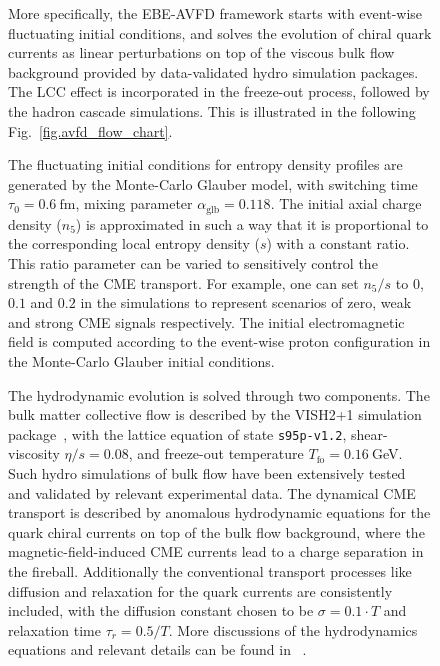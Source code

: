 \begin{figure}[htbp]
More specifically, the EBE-AVFD framework starts with event-wise fluctuating initial conditions, and solves the evolution of chiral quark currents as linear perturbations on top of the viscous bulk flow background provided by data-validated hydro simulation packages. The  LCC effect is incorporated in the freeze-out process, followed by the hadron cascade simulations. 
This is illustrated in the following Fig.~\ref{fig.avfd_flow_chart}.

\begin{figure}[htbp]
\vspace*{-0.01in}
 \label{fig:AVFD_delta}
\end{figure}


The fluctuating initial conditions for entropy density profiles are generated by the Monte-Carlo Glauber model, with switching time $\tau_0=0.6~\text{fm}$, mixing parameter $\alpha_\text{glb} = 0.118$. The initial axial charge density ($n_5$) is approximated in such a way that it is proportional to  the corresponding local entropy density ($s$) with a constant ratio. This ratio parameter can be varied to sensitively control the strength of the CME transport. For example, one can set  $n_5/s$ to $0$, $0.1$ and $0.2$  in the simulations to represent scenarios of zero, weak and strong CME signals respectively. The initial electromagnetic field is computed according to the event-wise proton configuration in the Monte-Carlo Glauber initial conditions.

The hydrodynamic evolution is solved through two components. The bulk matter collective flow is described by the VISH2+1 simulation package~\cite{Shen:2014vra}, with the lattice equation of state \texttt{s95p-v1.2}, shear-viscosity $\eta/s=0.08$, and freeze-out temperature $T_\text{fo}=0.16~$GeV. Such hydro simulations of bulk flow have been extensively tested and validated by relevant experimental data. The dynamical CME transport is described by anomalous hydrodynamic equations for the quark chiral currents on top of the bulk flow background, where the magnetic-field-induced CME currents lead to a charge separation in the fireball.   Additionally the conventional transport processes like diffusion and relaxation for the quark currents are consistently included, with the diffusion constant  chosen to be $\sigma=0.1\cdot T$ and relaxation time $\tau_r = 0.5/T$. More discussions of the hydrodynamics equations and relevant details can be found in ~\cite{Shi:2017cpu,Jiang:2016wve,Shi:2019wzi}. 


\end{figure}
